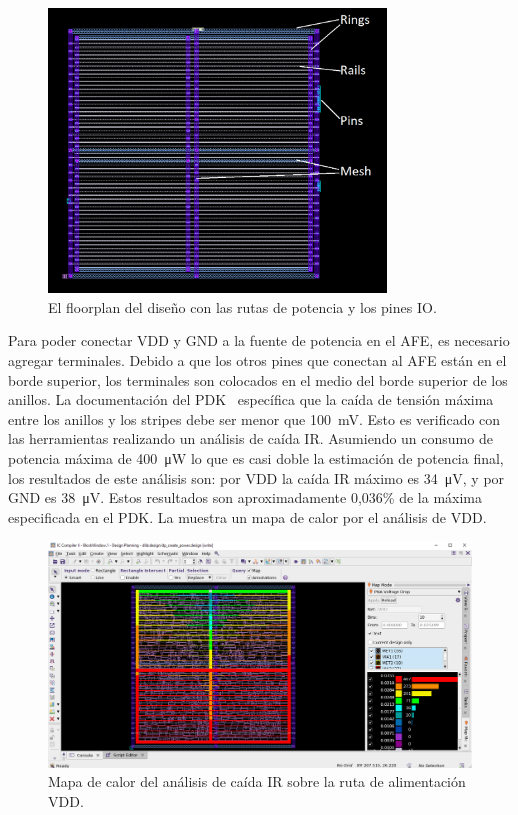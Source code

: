 \documentclass[a4paper, twoside, 11pt]{report}
\begin{document}
\begin{figure}[htb]
  \centering
  \includegraphics[width=0.8\textwidth]{./img/floorplan}
  \caption{El floorplan del diseño con las rutas de potencia y los pines IO.}
  \label{fig:floorplan_pg}
\end{figure}

\FloatBarrier

Para poder conectar VDD y GND a la fuente de potencia en el AFE, es necesario agregar terminales. Debido a que los otros pines que conectan al AFE están en el borde superior, los terminales son colocados en el medio del borde superior de los anillos. La documentación del PDK~\cite{dig_imp_guidelines} específica que la caída de tensión máxima entre los anillos y los stripes debe ser menor que \SI{100}{\milli\volt}. Esto es verificado con las herramientas realizando un análisis de caída IR. Asumiendo un consumo de potencia máxima de \SI{400}{\micro\watt} lo que es casi doble la estimación de potencia final, los resultados de este análisis son: por VDD la caída IR máximo es \SI{34}{\micro\volt}, y por GND es \SI{38}{\micro\volt}. Estos resultados son aproximadamente 0,036\% de la máxima especificada en el PDK. La  muestra un mapa de calor por el análisis de VDD.

\begin{figure}[htb]
  \centering
  \includegraphics[width=1.0\textwidth]{./img/dp_create_power_ir_drop}
  \caption{Mapa de calor del análisis de caída IR sobre la ruta de alimentación VDD.}
  \label{fig:ir_drop}
\end{figure}
\end{document}
